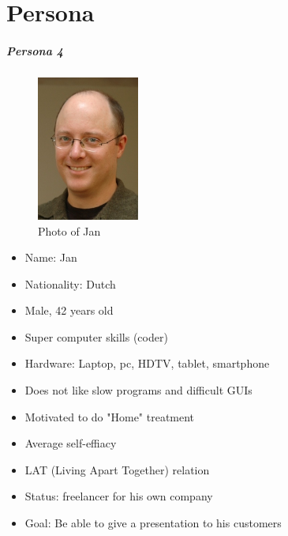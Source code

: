 \chapter{Persona}
\paragraph{Persona 4}
\begin{figure}
\centering
\includegraphics[width=0.3\textwidth]{"jan"}
\caption{Photo of Jan}
\end{figure}
\begin{itemize}
\item Name: Jan
\item Nationality: Dutch
\item Male, 42 years old
\item Super computer skills (coder)
\item Hardware: Laptop, pc, HDTV, tablet, smartphone
\item Does not like slow programs and difficult GUIs
\item Motivated to do "Home" treatment
\item Average self-effiacy
\item LAT (Living Apart Together) relation
\item Status: freelancer for his own company
\item Goal: Be able to give a presentation to his customers
\end{itemize}
